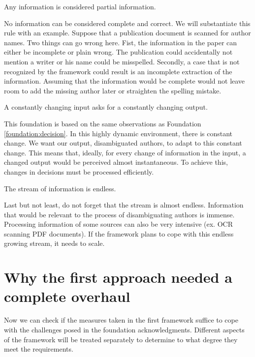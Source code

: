 \begin{foundation}
\label{foundation:partial}
Any information is considered partial information.
\end{foundation}

No information can be considered complete and correct. We will substantiate this rule with an example. Suppose that a publication document is scanned for author names. Two things can go wrong here. Fist, the information in the paper can either be incomplete or plain wrong. The publication could accidentally not mention a writer or his name could be misspelled. Secondly, a case that is not recognized by the framework could result is an incomplete extraction of the information. Assuming that the information would be complete would not leave room to add the missing author later or straighten the spelling mistake.

\begin{foundation}
\label{foundation:incremental}
A constantly changing input asks for a constantly changing output.
\end{foundation}

This foundation is based on the same observations as Foundation \autoref{foundation:decision}. In this highly dynamic environment, there is constant change. We want our output, disambiguated authors, to adapt to this constant change. This means that, ideally, for every change of information in the input, a changed output would be perceived almost instantaneous. To achieve this, changes in decisions must be processed efficiently.

\begin{foundation}
\label{foundation:endless}
The stream of information is endless.
\end{foundation}

Last but not least, do not forget that the stream is almost endless. Information that would be relevant to the process of disambiguating authors is immense. Processing information of some sources can also be very intensive (ex. OCR scanning PDF documents). If the framework plans to cope with this endless growing stream, it needs to scale.

\section{Why the first approach needed a complete overhaul}

Now we can check if the measures taken in the first framework suffice to cope with the challenges posed in the foundation acknowledgments. Different aspects of the framework will be treated separately to determine to what degree they meet the requirements.

